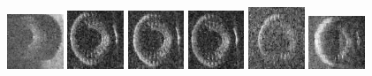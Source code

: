 \begin{figure}
    \centering
    \includegraphics[width=0.15\textwidth]{chapters/images/dataset/all-class-images/tire/tire-0.jpg}
    \includegraphics[width=0.15\textwidth]{chapters/images/dataset/all-class-images/tire/tire-219.jpg}
    \includegraphics[width=0.15\textwidth]{chapters/images/dataset/all-class-images/tire/tire-211.jpg}
    \includegraphics[width=0.15\textwidth]{chapters/images/dataset/all-class-images/tire/tire-253.jpg}
    \includegraphics[width=0.15\textwidth]{chapters/images/dataset/all-class-images/tire/tire-91.jpg}
    \includegraphics[width=0.15\textwidth]{chapters/images/dataset/all-class-images/tire/tire-172.jpg}
    

\end{figure}

